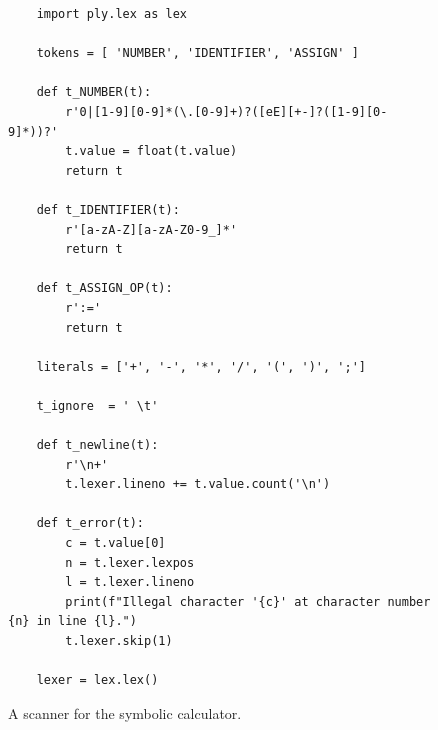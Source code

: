 \begin{figure}[!ht]
\centering
\begin{verbatim}
    import ply.lex as lex
    
    tokens = [ 'NUMBER', 'IDENTIFIER', 'ASSIGN' ]
    
    def t_NUMBER(t):
        r'0|[1-9][0-9]*(\.[0-9]+)?([eE][+-]?([1-9][0-9]*))?'
        t.value = float(t.value)
        return t
    
    def t_IDENTIFIER(t):
        r'[a-zA-Z][a-zA-Z0-9_]*'
        return t
    
    def t_ASSIGN_OP(t):
        r':='
        return t
    
    literals = ['+', '-', '*', '/', '(', ')', ';']
    
    t_ignore  = ' \t'

    def t_newline(t):
        r'\n+'
        t.lexer.lineno += t.value.count('\n')
        
    def t_error(t):
        c = t.value[0]
        n = t.lexer.lexpos
        l = t.lexer.lineno
        print(f"Illegal character '{c}' at character number {n} in line {l}.")
        t.lexer.skip(1)
    
    lexer = lex.lex()
\end{verbatim}
\vspace*{-0.3cm}
\caption{A scanner for the symbolic calculator.}
\label{fig:Symbolic-Calculator.ipynb:lex}
\end{figure}

